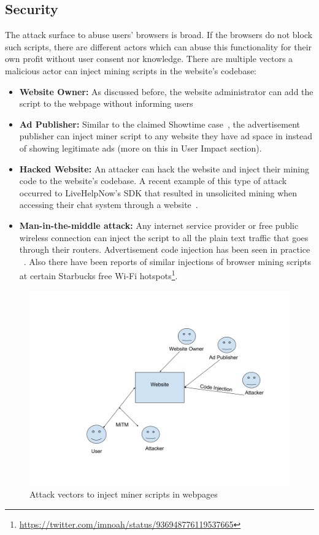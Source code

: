 \subsection{\textbf{Security}}
The attack surface to abuse users' browsers is broad. If the browsers do not block such scripts, there are different actors which can abuse this functionality for their own profit without user consent nor knowledge. There are multiple vectors a malicious actor can inject mining scripts in the website's codebase:
\begin{itemize}
\item \textbf{Website Owner:} As discussed before, the website administrator can add the script to the webpage without informing users
\item \textbf{Ad Publisher:} Similar to the claimed Showtime case~\cite{showtimehive}, the advertisement publisher can inject miner script to any website they have ad space in instead of showing legitimate ads (more on this in User Impact section).
\item \textbf{Hacked Website:} An attacker can hack the website and inject their mining code to the website's codebase. A recent example of this type of attack occurred to LiveHelpNow's SDK that resulted in unsolicited mining when accessing their chat system through a website~\cite{chatsupporthack}.
\item \textbf{Man-in-the-middle attack:} Any internet service provider or free public wireless connection can inject the script to all the plain text traffic that goes through their routers. Advertisement code injection has been seen in practice ~\cite{vergeadinjection}. Also there have been reports of similar injections of browser mining scripts at certain Starbucks free Wi-Fi hotspots\footnote{\url{https://twitter.com/imnoah/status/936948776119537665}}.
\end{itemize}


\begin{figure}[t]
\centering
\includegraphics[width=\linewidth]{figures/attack_vectors.png}
\caption{Attack vectors to inject miner scripts in webpages}
\end{figure}


